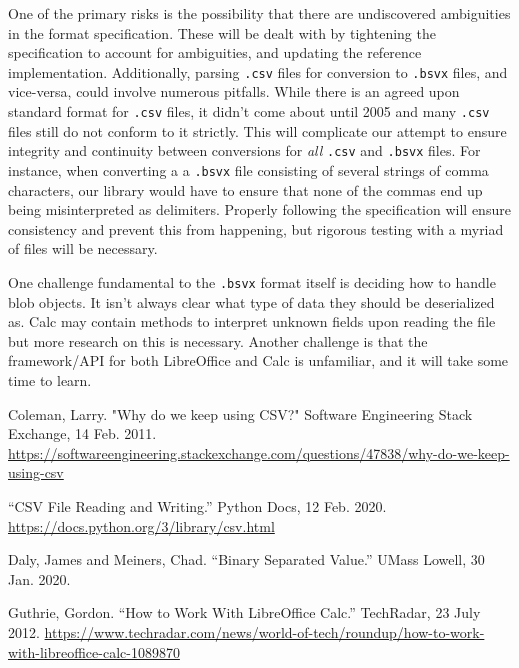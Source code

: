 \documentclass[10pt]{article}
\begin{document}
One of the primary risks is the possibility that there are undiscovered ambiguities in the format specification.
These will be dealt with by tightening the specification to account for ambiguities, and updating the reference implementation.
Additionally, parsing \texttt{.csv} files for conversion to \texttt{.bsvx} files, and vice-versa, could involve numerous pitfalls.
While there is an agreed upon standard format for \texttt{.csv} files, it didn’t come about until 2005 and many \texttt{.csv} files still do not conform to it strictly.
This will complicate our attempt to ensure integrity and continuity between conversions for \textit{all} \texttt{.csv} and \texttt{.bsvx} files.
For instance, when converting a a \texttt{.bsvx} file consisting of several strings of comma characters, our library would have to ensure that none of the commas end up being misinterpreted as delimiters.
Properly following the specification will ensure consistency and prevent this from happening, but rigorous testing with a myriad of files will be necessary.

\indent{}
One challenge fundamental to the \texttt{.bsvx} format itself is deciding how to handle blob objects.
It isn’t always clear what type of data they should be deserialized as.
Calc may contain methods to interpret unknown fields upon reading the file but more research on this is necessary.
Another challenge is that the framework/API for both LibreOffice and Calc is unfamiliar, and it will take some time to learn.

\clearpage
{}
\printnoidxglossary[nonumberlist]

\clearpage
\begin{thebibliography}{9}

    Coleman, Larry.
    "Why do we keep using CSV?"
    Software Engineering Stack Exchange,
    14 Feb. 2011.
    \url{https://softwareengineering.stackexchange.com/questions/47838/why-do-we-keep-using-csv}

    “CSV File Reading and Writing.”
    Python Docs,
    12 Feb. 2020.
    \url{https://docs.python.org/3/library/csv.html}

    Daly, James and Meiners, Chad.
    “Binary Separated Value.”
    UMass Lowell,
    30 Jan. 2020.

    Guthrie, Gordon.
    “How to Work With LibreOffice Calc.”
    TechRadar,
    23 July 2012.
    \url{https://www.techradar.com/news/world-of-tech/roundup/how-to-work-with-libreoffice-calc-1089870}
  
\end{thebibliography}
\end{document}
